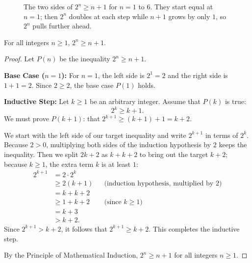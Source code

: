 \begin{figure}[htbp]
\centering
{}
\caption{The two sides of $2^n \ge n + 1$ for $n = 1$ to $6$. They start equal at $n = 1$; then $2^n$ doubles at each step while $n + 1$ grows by only $1$, so $2^n$ pulls further ahead.}
\label{17:fig-two-power-growth}
\end{figure}

\begin{theorem}
For all integers $n \ge 1$, $2^n \ge n + 1$.
\end{theorem}

\begin{proof}
Let $P(n)$ be the inequality $2^n \ge n + 1$.

\textbf{Base Case ($n = 1$):} For $n = 1$, the left side is $2^1 = 2$ and the right side is $1 + 1 = 2$. Since $2 \ge 2$, the base case $P(1)$ holds.

\textbf{Inductive Step:} Let $k \ge 1$ be an arbitrary integer. Assume that $P(k)$ is true:
\[
2^k \ge k + 1. \tag{Induction Hypothesis}
\]
We must prove $P(k+1)$: that $2^{k+1} \ge (k+1) + 1 = k + 2$.

We start with the left side of our target inequality and write $2^{k+1}$ in terms of $2^k$. Because $2 > 0$, multiplying both sides of the induction hypothesis by $2$ keeps the inequality. Then we split $2k + 2$ as $k + k + 2$ to bring out the target $k + 2$; because $k \ge 1$, the extra term $k$ is at least $1$:
\begin{align*}
2^{k+1} &= 2 \cdot 2^k \\
&\ge 2(k + 1) && \text{(induction hypothesis, multiplied by } 2\text{)} \\
&= k + k + 2 \\
&\ge 1 + k + 2 && \text{(since } k \ge 1\text{)} \\
&= k + 3 \\
&> k + 2.
\end{align*}
Since $2^{k+1} > k + 2$, it follows that $2^{k+1} \ge k + 2$. This completes the inductive step.

By the Principle of Mathematical Induction, $2^n \ge n + 1$ for all integers $n \ge 1$.
\end{proof}

